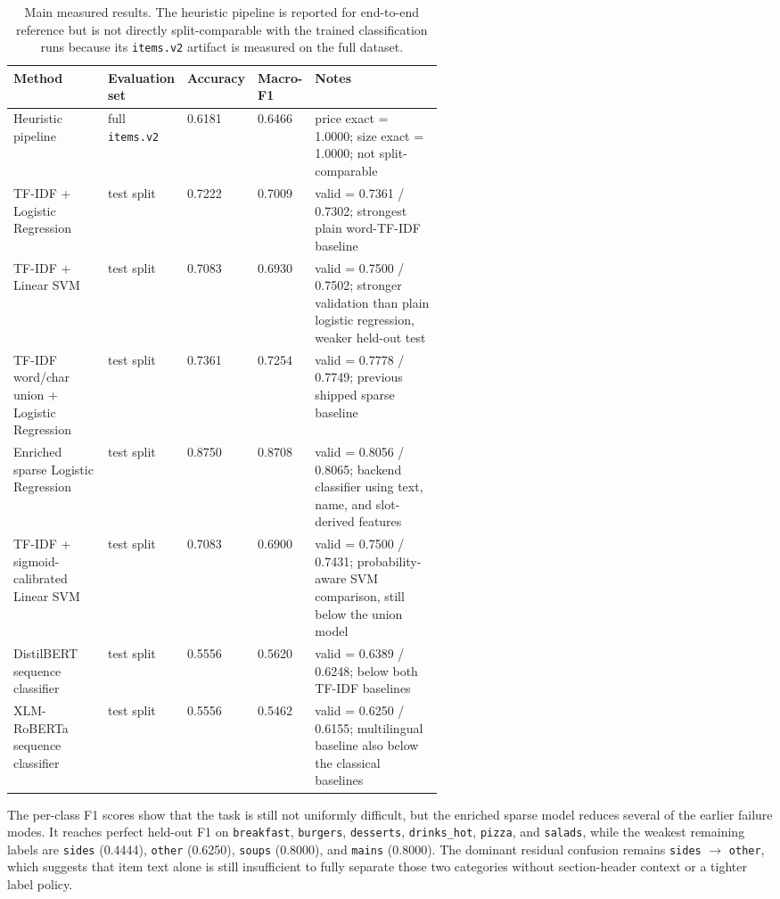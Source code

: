\documentclass{article}
\begin{document}
\begin{table}[t]
\centering
\small
\begin{tabularx}{\linewidth}{p{0.22\linewidth}p{0.14\linewidth}p{0.1\linewidth}p{0.1\linewidth}X}
\toprule
Method & Evaluation set & Accuracy & Macro-F1 & Notes \\
\midrule
Heuristic pipeline & full \texttt{items.v2} & 0.6181 & 0.6466 & price exact = 1.0000; size exact = 1.0000; not split-comparable \\
TF-IDF + Logistic Regression & test split & 0.7222 & 0.7009 & valid = 0.7361 / 0.7302; strongest plain word-TF-IDF baseline \\
TF-IDF + Linear SVM & test split & 0.7083 & 0.6930 & valid = 0.7500 / 0.7502; stronger validation than plain logistic regression, weaker held-out test \\
TF-IDF word/char union + Logistic Regression & test split & 0.7361 & 0.7254 & valid = 0.7778 / 0.7749; previous shipped sparse baseline \\
Enriched sparse Logistic Regression & test split & 0.8750 & 0.8708 & valid = 0.8056 / 0.8065; backend classifier using text, name, and slot-derived features \\
TF-IDF + sigmoid-calibrated Linear SVM & test split & 0.7083 & 0.6900 & valid = 0.7500 / 0.7431; probability-aware SVM comparison, still below the union model \\
DistilBERT sequence classifier & test split & 0.5556 & 0.5620 & valid = 0.6389 / 0.6248; below both TF-IDF baselines \\
XLM-RoBERTa sequence classifier & test split & 0.5556 & 0.5462 & valid = 0.6250 / 0.6155; multilingual baseline also below the classical baselines \\
\bottomrule
\end{tabularx}
\caption{Main measured results. The heuristic pipeline is reported for end-to-end reference but is not directly split-comparable with the trained classification runs because its \texttt{items.v2} artifact is measured on the full dataset.}
\label{tab:main-results}
\end{table}

The per-class F1 scores show that the task is still not uniformly difficult,
but the enriched sparse model reduces several of the earlier failure modes. It
reaches perfect held-out F1 on \texttt{breakfast}, \texttt{burgers},
\texttt{desserts}, \texttt{drinks\_hot}, \texttt{pizza}, and
\texttt{salads}, while the weakest remaining labels are \texttt{sides}
(0.4444), \texttt{other} (0.6250), \texttt{soups} (0.8000), and
\texttt{mains} (0.8000). The dominant residual confusion remains
\texttt{sides} $\rightarrow$ \texttt{other}, which suggests that item text
alone is still insufficient to fully separate those two categories without
section-header context or a tighter label policy.
\end{document}
